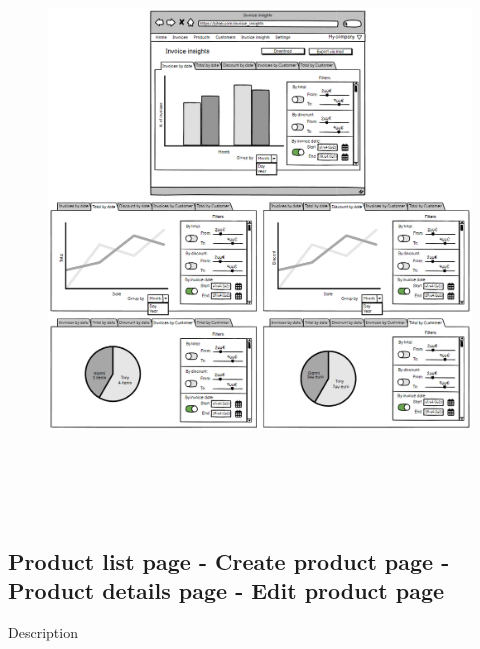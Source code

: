 \begin{figure}[h!]
    \centering
    \includegraphics[height=440pt, keepaspectratio]{resources/mockup/Invoice_insights.png}
\end{figure}
\newpage
\subsection{Product list page - Create product page - Product details page - Edit product page}

Description

